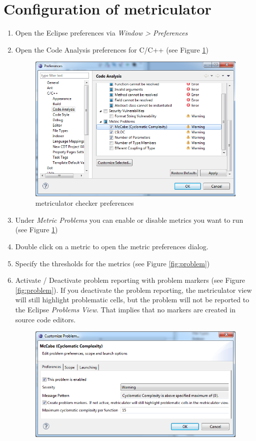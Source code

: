 \documentclass[11pt,a4paper,oneside]{scrreprt}
\begin{document}
\section{Configuration of metriculator}
\begin{enumerate}
\item Open the Eclipse preferences via \textit{Window > Preferences}
\item Open the Code Analysis preferences for C/C++ (see Figure \ref{fig:preferences})
\begin{figure}[th]
\begin{center}
\includegraphics[scale=0.5]{figures/preferences.png}
\end{center}
\caption{metriculator checker preferences}
\label{fig:preferences}
\end{figure}
\item Under \textit{Metric Problems} you can enable or disable metrics you want to run (see Figure \ref{fig:preferences})
\item Double click on a metric to open the metric preferences dialog.
\item Specify the thresholds for the metrics (see Figure \ref{fig:problem})
\item Activate / Deactivate problem reporting with problem markers (see Figure \ref{fig:problem}). If you deactivate the problem reporting, the metriculator view will still highlight problematic cells, but the problem will not be reported to the Eclipse \textit{Problems View}. That implies that no markers are created in source code editors.
\begin{figure}[th]
\begin{center}
\includegraphics[scale=0.5]{figures/problem.png}

\end{center}
\end{figure}
\end{enumerate}
\end{document}

